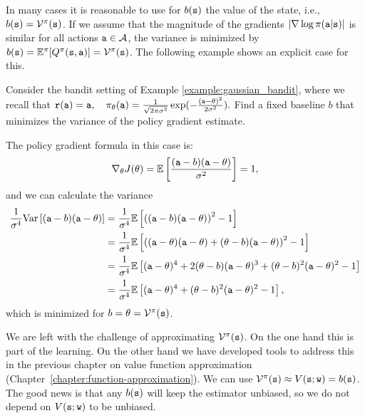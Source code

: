 In many cases it is reasonable to use for $b({\tt s})$ the value of the state,
i.e., $b({\tt s})=\mathcal{V}^\pi({\tt s})$. If we assume that the
magnitude of the gradients $|\nabla
\log \pi({\tt a}|{\tt s})|$ is similar for all actions
${\tt a}\in \mathcal{A}$, the variance is minimized 
by
$b({\tt s})=\mathbb{E}^\pi[Q^\pi({\tt s},{\tt a})]=\mathcal{V}^\pi({\tt s})$.
The following example shows an explicit case for this.
\begin{example}
    Consider the bandit setting of Example \ref{example:gaussian_bandit}, where we recall that
$        {\tt r}({\tt a}) = {\tt a}, \quad
        \pi_\theta({\tt a}) = \frac{1}{\sqrt{2 \pi \sigma^2}} \exp (- \frac{({\tt a} - \theta)^2}{2 \sigma^2}).$
Find a fixed baseline $b$ that minimizes the variance of the policy gradient estimate.

The policy gradient formula in this case is:
\begin{equation*}
        \nabla_\theta J(\theta) = \mathbb{E} \left[\frac{({\tt a}-b)({\tt a} - \theta)}{\sigma^2}\right] = 1, 
\end{equation*}
and we can calculate the variance
\begin{equation*}
\begin{split}
        \frac{1}{\sigma^4}\textrm{Var}\left[({\tt a}-b)({\tt a} - \theta)\right]  
        &=\frac{1}{\sigma^4}\mathbb{E}\left[\left(({\tt a}-b)({\tt a} - \theta)\right)^2 - 1\right] \\
        &=\frac{1}{\sigma^4}\mathbb{E}\left[\left(({\tt a}-\theta)({\tt a} - \theta) + (\theta-b)({\tt a} - \theta)\right)^2 - 1\right] \\
        &=\frac{1}{\sigma^4}\mathbb{E}\left[({\tt a}-\theta)^4 + 2(\theta-b)({\tt a} - \theta)^3 + (\theta-b)^2({\tt a} - \theta)^2 - 1\right] \\
        &=\frac{1}{\sigma^4}\mathbb{E}\left[({\tt a}-\theta)^4 + (\theta-b)^2({\tt a} - \theta)^2 - 1\right],
\end{split}
\end{equation*}
which is minimized for $b=\theta = \mathcal{V}^{\pi}({\tt s})$.
\end{example}

We are left with the challenge of approximating
$\mathcal{V}^\pi({\tt s})$. On the one hand this is part of the
learning. On the other hand we have developed tools to address this
in the previous chapter on value function approximation (Chapter~\ref{chapter:function-approximation}). We can use
$\mathcal{V}^\pi({\tt s})\approx V({\tt s};{\tt w})=b({\tt s})$. The
good news is that any $b({\tt s})$ will keep the estimator unbiased,
so we do not depend on $V({\tt s};{\tt w})$ to be unbiased.


